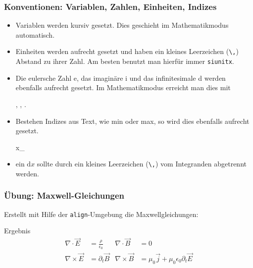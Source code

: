 \begin{frame}[fragile]
    \frametitle{Konventionen: Variablen, Zahlen, Einheiten, Indizes}
    \begin{itemize}
        \item Variablen werden kursiv gesetzt. Dies geschieht im Mathematikmodus automatisch.
        \item Einheiten werden aufrecht gesetzt und haben ein kleines Leerzeichen (\verb+\,+) Abstand zu ihrer Zahl. Am besten benutzt man hierfür immer \texttt{siunitx}.
        \item Die eulersche Zahl e, das imaginäre i und das infinitesimale d werden ebenfalls aufrecht gesetzt. Im Mathematikmodus erreicht man dies mit 
            \begin{lstverbatim}
            , , .
            \end{lstverbatim}
        \item Bestehen Indizes aus Text, wie min oder max, so wird dies ebenfalls aufrecht gesetzt.
            \begin{lstverbatim}
            x_
            \end{lstverbatim}
        \item ein $\mathrm{d}x$ sollte durch ein kleines Leerzeichen (\verb+\,+) vom Integranden abgetrennt werden.
    \end{itemize}
\end{frame}
\begin{frame}
    \frametitle{Übung: Maxwell-Gleichungen}
    Erstellt mit Hilfe der \texttt{align}-Umgebung die Maxwellgleichungen:
    \begin{block}{Ergebnis}
        \begin{align}
            \nabla \cdot \vec{E} &= \frac{\rho} {\epsilon_0} &
            \nabla \cdot \vec{B} &= 0 \\
            \nabla \times \vec{E} &= \partial_t \vec{B} &
            \nabla \times \vec{B} &= \mu_0 \vec{j} + \mu_0 \epsilon_0 \partial_t \vec{E}
            \label{align}
        \end{align}
    \end{block}
\end{frame}

